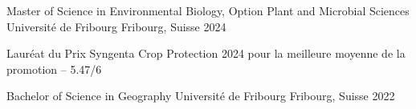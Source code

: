 

\begin{cventries}

  \cventry
    {Master of Science in Environmental Biology, Option Plant and Microbial Sciences} %
    {Université de Fribourg} %
    {Fribourg, Suisse} %
    {2024} %
    {
      \begin{cvitems} %
        \item {Lauréat du Prix Syngenta Crop Protection 2024 pour la meilleure moyenne de la promotion -- 5.47/6}
      \end{cvitems}
    }

  \cventry
    {Bachelor of Science in Geography} %
    {Université de Fribourg} %
    {Fribourg, Suisse} %
    {2022} %
    {}

\end{cventries}

